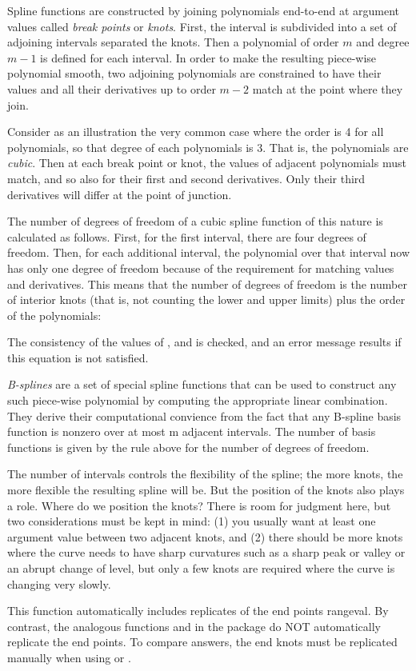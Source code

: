 \documentclass{article}
\begin{document}
\begin{Details}\relax
Spline functions are constructed by joining polynomials end-to-end at
argument values called \emph{break points} or \emph{knots}. First, the
interval is subdivided into a set of adjoining intervals
separated the knots.  Then a polynomial of order $m$ and
degree $m-1$ is defined for each interval.  In order to make the
resulting piece-wise polynomial smooth, two adjoining polynomials are
constrained to have their values and all their derivatives up to order
$m-2$ match at the point where they join.

Consider as an illustration the very common case where the order is 4
for all polynomials, so that degree of each polynomials is 3.  That
is, the polynomials are \emph{cubic}.  Then at each break point or
knot, the values of adjacent polynomials must match, and so also for
their first and second derivatives.  Only their third derivatives will
differ at the point of junction.

The number of degrees of freedom of a cubic spline function of this
nature is calculated as follows.  First, for the first interval, there
are four degrees of freedom.  Then, for each additional interval, the
polynomial over that interval now has only one degree of freedom
because of the requirement for matching values and derivatives.  This
means that the number of degrees of freedom is the number of interior
knots (that is, not counting the lower and upper limits) plus the
order of the polynomials:


The consistency of the values of ,  and
 is checked, and an error message results if this
equation is not satisfied.

\emph{B-splines} are a set of special spline functions that can be
used to construct any such piece-wise polynomial by computing the
appropriate linear combination.  They derive their computational
convience from the fact that any B-spline basis function is nonzero
over at most m adjacent intervals.  The number of basis functions is
given by the rule above for the number of degrees of freedom.

The number of intervals controls the flexibility of the spline;  the
more knots, the more flexible the resulting spline will be. But the
position of the knots also plays a role.  Where do we position the
knots?  There is room for judgment here, but two considerations must
be kept in mind:  (1) you usually want at least one argument value
between two adjacent knots, and (2)  there should be more knots where
the curve needs to have sharp curvatures such as a sharp peak or
valley or an abrupt change of level, but only a few knots are required
where the curve is changing very slowly.

This function automatically includes  replicates of the
end points rangeval.  By contrast, the analogous functions
 and  in the
 package do NOT automatically replicate the end points.
To compare answers, the end knots must be replicated manually when
using  or .
\end{Details}
\end{document}
